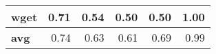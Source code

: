 \begin{table}[!tb]
{\begin{tabular}{|l|r|r|r|r|r|}
            wget                                & 0.71                                   & 0.54                                 & 0.50                                   & 0.50                                    & 1.00                         \\ \hline
            \textbf{avg}                                 & 0.74                                   & 0.63                                 & 0.61                                   & 0.69                                    & 0.99                         \\ \hline
            \end{tabular}

        \label{tab:normalcase}
        }
\end{table}